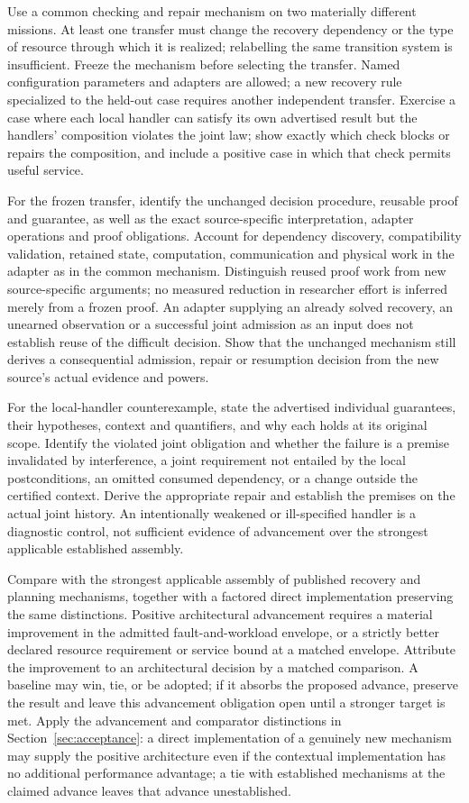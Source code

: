 \documentclass[11pt]{article}
\begin{document}
Use a common checking and repair mechanism on two materially different missions. At least one transfer must change the recovery dependency or the type of resource through which it is realized; relabelling the same transition system is insufficient. Freeze the mechanism before selecting the transfer. Named configuration parameters and adapters are allowed; a new recovery rule specialized to the held-out case requires another independent transfer. Exercise a case where each local handler can satisfy its own advertised result but the handlers' composition violates the joint law; show exactly which check blocks or repairs the composition, and include a positive case in which that check permits useful service.

For the frozen transfer, identify the unchanged decision procedure, reusable proof and guarantee, as well as the exact source-specific interpretation, adapter operations and proof obligations. Account for dependency discovery, compatibility validation, retained state, computation, communication and physical work in the adapter as in the common mechanism. Distinguish reused proof work from new source-specific arguments; no measured reduction in researcher effort is inferred merely from a frozen proof. An adapter supplying an already solved recovery, an unearned observation or a successful joint admission as an input does not establish reuse of the difficult decision. Show that the unchanged mechanism still derives a consequential admission, repair or resumption decision from the new source's actual evidence and powers.

For the local-handler counterexample, state the advertised individual guarantees, their hypotheses, context and quantifiers, and why each holds at its original scope. Identify the violated joint obligation and whether the failure is a premise invalidated by interference, a joint requirement not entailed by the local postconditions, an omitted consumed dependency, or a change outside the certified context. Derive the appropriate repair and establish the premises on the actual joint history. An intentionally weakened or ill-specified handler is a diagnostic control, not sufficient evidence of advancement over the strongest applicable established assembly.

Compare with the strongest applicable assembly of published recovery and planning mechanisms, together with a factored direct implementation preserving the same distinctions. Positive architectural advancement requires a material improvement in the admitted fault-and-workload envelope, or a strictly better declared resource requirement or service bound at a matched envelope. Attribute the improvement to an architectural decision by a matched comparison. A baseline may win, tie, or be adopted; if it absorbs the proposed advance, preserve the result and leave this advancement obligation open until a stronger target is met. Apply the advancement and comparator distinctions in Section~\ref{sec:acceptance}: a direct implementation of a genuinely new mechanism may supply the positive architecture even if the contextual implementation has no additional performance advantage; a tie with established mechanisms at the claimed advance leaves that advance unestablished.
\end{document}
